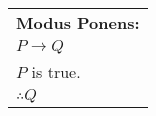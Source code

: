 \documentclass[convert,float=true,crop=true]{standalone}
\begin{document}

\parbox[t][60px][c]{90px}{
\begin{tabular}{l}
\textbf{Modus Ponens:}\\
$P \rightarrow  Q$\\
$P$ is true.\\
$\therefore Q$
\end{tabular}
}
\end{document}
